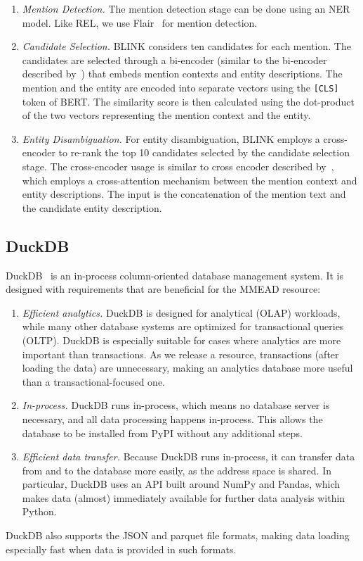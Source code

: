\begin{enumerate}
    \item \emph{Mention Detection.} The mention detection stage can be done using an NER model. Like REL, we use Flair~\citep{flair} for mention detection.
	\item \emph{Candidate Selection.} BLINK considers ten candidates for each mention. The candidates are selected through a bi-encoder (similar to the bi-encoder described by~\citet{poly-encoders}) that embeds mention contexts and entity descriptions. The mention and the entity are encoded into separate vectors using the \texttt{[CLS]} token of BERT. The similarity score is then calculated using the dot-product of the two vectors representing the mention context and the entity.  
	\item \emph{Entity Disambiguation.} For entity disambiguation, BLINK employs a cross-encoder to re-rank the top 10 candidates selected by the candidate selection stage. The cross-encoder usage is similar to cross encoder described by~\citet{poly-encoders}, which employs a cross-attention mechanism between the mention context and entity descriptions. The input is the concatenation of the mention text and the candidate entity description.    
\end{enumerate}

\subsection{DuckDB}
DuckDB~\citep{duckdb} is an in-process column-oriented database management system. It is designed with requirements that are beneficial for the MMEAD resource:
\begin{enumerate}
    \item \emph{Efficient analytics.} DuckDB is designed for analytical (OLAP) workloads, while many other database systems are optimized for transactional queries (OLTP). DuckDB is especially suitable for cases where analytics are more important than transactions. As we release a resource, transactions (after loading the data) are unnecessary, making an analytics database more useful than a transactional-focused one.  
	\item \emph{In-process.} DuckDB runs in-process, which means no database server is necessary, and all data processing happens in-process. This allows the database to be installed from PyPI without any additional steps. 
	\item \emph{Efficient data transfer.} Because DuckDB runs in-process, it can transfer data from and to the database more easily, as the address space is shared. In particular, DuckDB uses an API built around NumPy and Pandas, which makes data (almost) immediately available for further data analysis within Python. 
\end{enumerate}
DuckDB also supports the JSON and parquet file formats, making data loading especially fast when data is provided in such formats.

